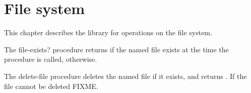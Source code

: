 \chapter{File system}
\label{filesystemchapter}

This chapter describes the  library for
operations on the file system.

\begin{entry}{%
}

  The {\cf file-exists?} procedure
returns \schtrue{} if the named file exists at the time the procedure
is called, \schfalse{} otherwise.
\end{entry}

\begin{entry}{%
}

  The {\cf delete-file} procedure
deletes the named file if it exists, and returns \unspecifiedreturn.
If the file cannot be deleted FIXME.
\end{entry}


